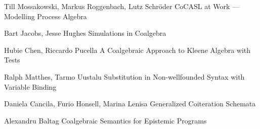  {Till Mossakowski, Markus Roggenbach, Lutz Schr{\"o}der}
 {CoCASL at Work --- Modelling Process Algebra}

 {Bart Jacobs, Jesse Hughes}
 {Simulations in Coalgebra}

 {Hubie Chen, Riccardo Pucella}
 {A Coalgebraic Approach to Kleene Algebra with Tests}

 {Ralph Matthes, Tarmo Uustalu}
 {Substitution in Non-wellfounded Syntax with Variable Binding}

 {Daniela Cancila, Furio Honsell, Marina Lenisa}
 {Generalized Coiteration Schemata}

 {Alexandru Baltag}
 {Coalgebraic Semantics for Epistemic Programs}

